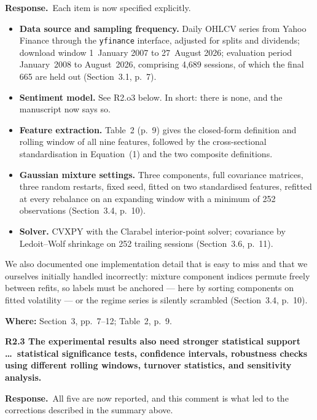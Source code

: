 \documentclass[11pt,a4paper]{article}
\newcommand{\rc}[1]{\par\medskip\noindent\textbf{#1}\par\nopagebreak}
\newcommand{\resp}{\par\noindent\textbf{Response.}\ }
\newcommand{\where}[1]{\par\smallskip\noindent\textcolor{blue!55!black}{\textbf{Where:} #1}\par}
\begin{document}
\resp Each item is now specified explicitly.

\begin{itemize}
\item \textbf{Data source and sampling frequency.} Daily OHLCV series from Yahoo Finance
through the \texttt{yfinance} interface, adjusted for splits and dividends; download
window 1~January 2007 to 27~August 2026; evaluation period January~2008 to
August~2026, comprising 4{,}689 sessions, of which the final 665 are held out
(Section~3.1, p.~7).
\item \textbf{Sentiment model.} See R2.o3 below. In short: there is none, and the
manuscript now says so.
\item \textbf{Feature extraction.} Table~2 (p.~9) gives the closed-form definition and
rolling window of all nine features, followed by the cross-sectional standardisation in
Equation~(1) and the two composite definitions.
\item \textbf{Gaussian mixture settings.} Three components, full covariance matrices,
three random restarts, fixed seed, fitted on two standardised features, refitted at
every rebalance on an expanding window with a minimum of 252 observations
(Section~3.4, p.~10).
\item \textbf{Solver.} CVXPY with the Clarabel interior-point solver; covariance by
Ledoit--Wolf shrinkage on 252 trailing sessions (Section~3.6, p.~11).
\end{itemize}

We also documented one implementation detail that is easy to miss and that we ourselves
initially handled incorrectly: mixture component indices permute freely between refits,
so labels must be anchored --- here by sorting components on fitted volatility --- or the
regime series is silently scrambled (Section~3.4, p.~10).
\where{Section~3, pp.~7--12; Table~2, p.~9.}

\rc{R2.3 The experimental results also need stronger statistical support \dots\
statistical significance tests, confidence intervals, robustness checks using different
rolling windows, turnover statistics, and sensitivity analysis.}

\resp All five are now reported, and this comment is what led to the corrections
described in the summary above.
\end{document}

